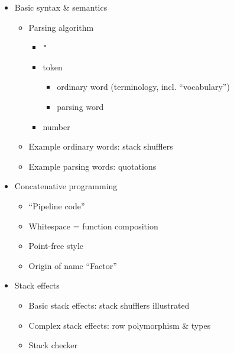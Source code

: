 \begin{itemize}

\item Basic syntax \& semantics
      \begin{itemize}
        \item Parsing algorithm
              \begin{itemize}
                \item \verb|"|
                \item token
                      \begin{itemize}
                        \item ordinary word (terminology, incl. ``vocabulary'')
                        \item parsing word
                      \end{itemize}
                \item number
              \end{itemize}
        \item Example ordinary words: stack shufflers
        \item Example parsing words: quotations
      \end{itemize}

\item Concatenative programming
      \begin{itemize}
        \item ``Pipeline code''
        \item Whitespace = function composition
        \item Point-free style
        \item Origin of name ``Factor''
      \end{itemize}

\item Stack effects
      \begin{itemize}
        \item Basic stack effects: stack shufflers illustrated
        \item Complex stack effects: row polymorphism \& types
        \item Stack checker
      \end{itemize}


\end{itemize}
